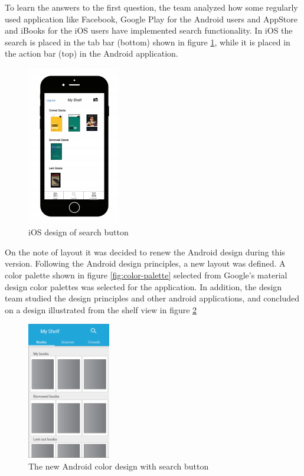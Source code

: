 To learn the answers to the first question, the team analyzed how some regularly used application like Facebook, Google Play for the Android users and AppStore and iBooks for the iOS users have implemented search functionality. In iOS the search is placed in the tab bar (bottom) shown in figure \ref{fig:ios-search-design}, while it is placed in the action bar (top) in the Android application.
\begin{figure}
\centering
\includegraphics[height=7cm]{figs/v05/ios-search-design.png}
\caption{iOS design of search button}
\label{fig:ios-search-design}
\end{figure}


On the note of layout it was decided to renew the Android design during this version. Following the Android design principles, a new layout was defined. \cite{android-design} A color palette shown in figure \ref{fig:color-palette} selected from Google’s material design color palettes was selected for the application. In addition, the design team studied the design principles and other android applications, and concluded on a design illustrated from the shelf view in figure \ref{fig:android-design}

\begin{figure}
\centering
\includegraphics[height=6cm]{figs/v05/android-search-design.png}
\caption{The new Android color design with search button}
\label{fig:android-design}
\end{figure}

